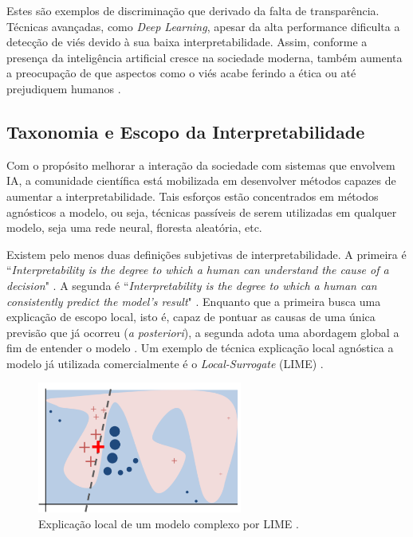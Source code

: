 \documentclass[]{politex}
\begin{document}
Estes são exemplos de discriminação que derivado da falta de transparência. Técnicas avançadas, como \textit{Deep Learning}, apesar da alta performance dificulta a detecção de viés devido à sua baixa interpretabilidade.  Assim, conforme a presença da inteligência artificial cresce na sociedade moderna, também aumenta a preocupação de que aspectos como o viés acabe ferindo a ética ou até prejudiquem humanos \cite{Bostrom_theethics}.

\subsection{Taxonomia e Escopo da Interpretabilidade}

Com o propósito melhorar a interação da sociedade com sistemas que envolvem IA, a comunidade científica está mobilizada em desenvolver métodos capazes de aumentar a interpretabilidade. Tais esforços estão concentrados em métodos agnósticos a modelo, ou seja, técnicas passíveis de serem utilizadas em qualquer modelo, seja uma rede neural, floresta aleatória, etc.

Existem pelo menos duas definições subjetivas de interpretabilidade. A primeira é ``\textit{Interpretability is the degree to which a human can understand the cause of a decision}" \cite{DBLP:journals/corr/Miller17a}. A segunda é ``\textit{Interpretability is the degree to which a human can consistently predict the model’s result}" \cite{NIPS2016_6300}. Enquanto que a primeira busca uma explicação de escopo local, isto é, capaz de pontuar as causas de uma única previsão que já ocorreu (\textit{a posteriori}), a segunda adota uma abordagem global a fim de entender o modelo . Um exemplo de técnica explicação local agnóstica a modelo já utilizada comercialmente é o  \textit{Local-Surrogate} (LIME) \cite{Ribeiro:2016:WIT:2939672.2939778}.

\begin{figure}[h]
    \centering
    \includegraphics[width=0.6\textwidth]{images/lime-showcase.png}
    \caption{Explicação local de um modelo complexo por LIME \cite{Ribeiro:2016:WIT:2939672.2939778}.}
    \label{fig:lime_showcase}
\end{figure}
\end{document}
